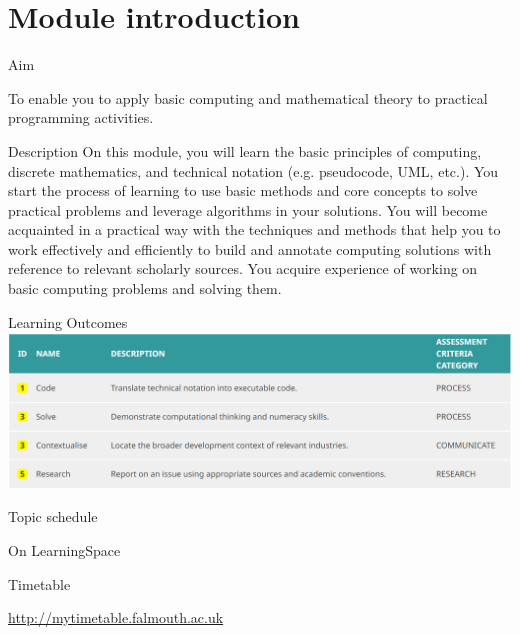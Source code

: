 \part{Module introduction}
\frame{\partpage}

\begin{frame}{Aim}
\begin{center}
To enable you to apply basic computing and mathematical theory to practical programming activities.
\end{center}
\end{frame}

\begin{frame}{Description}
On this module, you will learn the basic principles of computing, discrete mathematics, and technical notation (e.g. pseudocode, UML, etc.). You start the process of learning to use basic methods and core concepts to solve practical problems and leverage algorithms in your solutions. You will become acquainted in a practical way with the techniques and methods that help you to work effectively and efficiently to build and annotate computing solutions with reference to relevant scholarly sources. You acquire experience of working on basic computing problems and solving them.
\end{frame}

\begin{frame}{Learning Outcomes}
	\includegraphics[width=\textwidth]{learning_outcomes}
\end{frame}

\begin{frame}{Topic schedule}
	\begin{center}
		On LearningSpace
	\end{center}
\end{frame}

\begin{frame}{Timetable}
	\begin{center}
		\url{http://mytimetable.falmouth.ac.uk}
	\end{center}
\end{frame}

